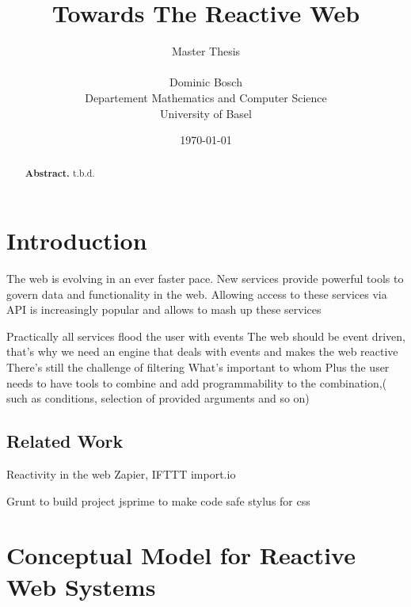 \documentclass[11pt]{article}%
\newcommand{\subtitle}[1]{%
  \posttitle{%
    \par\end{center}
    \begin{center}\large#1\end{center}
    \vskip0.5em}%
}
\begin{document}
\title{\huge Towards The Reactive Web\vspace*{15 mm}}
\date{\today}
\author{\fontsize{11}{9}\selectfont
Master Thesis\\
\vspace*{10 mm}\\
Dominic Bosch\\
Departement Mathematics and Computer Science\\
University of Basel
}
\maketitle

\renewcommand{\abstractname}{}
\begin{abstract}
\textbf{Abstract.}
t.b.d.
\end{abstract}


\newpage
\tableofcontents
\newpage


\section{Introduction}
The web is evolving in an ever faster pace.
New services provide powerful tools to govern data and functionality in the web.
Allowing access to these services via API is increasingly popular and allows to mash up these services

Practically all services flood the user with events
The web should be event driven, that's why we need an engine that deals with events and makes the web reactive
There's still the challenge of filtering
What's important to whom
Plus the user needs to have tools to combine and add programmability to the combination,( such as conditions, selection of provided arguments and so on)




\subsection{Related Work}
Reactivity in the web
Zapier, IFTTT
import.io


Grunt to build project
jsprime to make code safe
stylus for css

\section{Conceptual Model for Reactive Web Systems}
\end{document}

